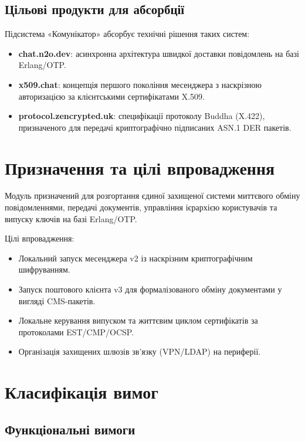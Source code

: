 \documentclass{article}
\begin{document}
\subsection{Цільові продукти для абсорбції}
Підсистема «Комунікатор» абсорбує технічні рішення таких систем:
\begin{itemize}
    \item \textbf{chat.n2o.dev}: асинхронна архітектура швидкої доставки повідомлень на базі Erlang/OTP.
    \item \textbf{x509.chat}: концепція першого покоління месенджера з наскрізною авторизацією за клієнтськими сертифікатами X.509.
    \item \textbf{protocol.zencrypted.uk}: специфікації протоколу Buddha (X.422), призначеного для передачі криптографічно підписаних ASN.1 DER пакетів.
\end{itemize}

\section{Призначення та цілі впровадження}
Модуль призначений для розгортання єдиної захищеної системи миттєвого обміну повідомленнями, передачі документів, управління ієрархією користувачів та випуску ключів на базі Erlang/OTP.

Цілі впровадження:
\begin{itemize}
    \item Локальний запуск месенджера v2 із наскрізним криптографічним шифруванням.
    \item Запуск поштового клієнта v3 для формалізованого обміну документами у вигляді CMS-пакетів.
    \item Локальне керування випуском та життєвим циклом сертифікатів за протоколами EST/CMP/OCSP.
    \item Організація захищених шлюзів зв'язку (VPN/LDAP) на периферії.
\end{itemize}

\newpage
\section{Класифікація вимог}

\subsection{Функціональні вимоги}
\end{document}
